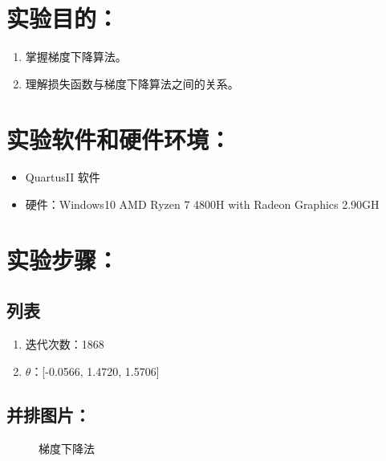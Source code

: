 \documentclass{sdureport}
\begin{document}
\begin{sduDocument}
	\section{实验目的：}
	\begin{enumerate}
		\renewcommand{\labelenumi}{(\theenumi)}
		\item 掌握梯度下降算法。
		\item 理解损失函数与梯度下降算法之间的关系。
	\end{enumerate}

	\section{实验软件和硬件环境：}
	\begin{itemize}[leftmargin=1em]
		\item QuartusII 软件
		\item 硬件：Windows10 AMD Ryzen 7 4800H with Radeon Graphics 2.90GH
	\end{itemize}


	\section{实验步骤：}

	\subsection{列表}
	\begin{enumerate}
		\item 迭代次数：1868
		\item $\theta$：[-0.0566, 1.4720, 1.5706]
	\end{enumerate}
	\subsection{并排图片：}
	\begin{figure}[H]
		\caption{梯度下降法}
	\end{figure}


\end{sduDocument}
\end{document}
